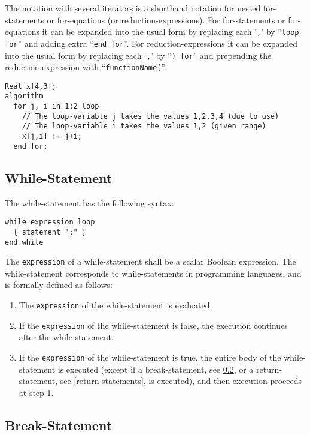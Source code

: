 The notation with several iterators is a shorthand notation for nested
for-statements or for-equations (or reduction-expressions). For
for-statements or for-equations it can be expanded into the usual form
by replacing each `\lstinline!,!' by ``\lstinline!loop for!'' and adding extra ``\lstinline!end for!''. For
reduction-expressions it can be expanded into the usual form by
replacing each `\lstinline!,!' by ``\lstinline!) for!'' and prepending the reduction-expression
with ``\lstinline!functionName(!''.

\begin{example}
\begin{lstlisting}[language=modelica]
  Real x[4,3];
algorithm
  for j, i in 1:2 loop
    // The loop-variable j takes the values 1,2,3,4 (due to use)
    // The loop-variable i takes the values 1,2 (given range)
    x[j,i] := j+i;
  end for;
\end{lstlisting}
\end{example}

\subsection{While-Statement}\label{while-statement}

The while-statement has the following syntax:
\begin{lstlisting}[language=grammar]
while expression loop
  { statement ";" }
end while
\end{lstlisting}
The \lstinline!expression! of a while-statement shall be a scalar Boolean
expression. The while-statement corresponds to while-statements in
programming languages, and is formally defined as follows:
\begin{enumerate}
\item The \lstinline!expression! of the while-statement is evaluated.
\item If the \lstinline!expression! of the while-statement is false, the execution
continues after the while-statement.
\item If the \lstinline!expression! of the while-statement is true, the entire body of
the while-statement is executed (except if a break-statement, see
\cref{break-statement}, or a return-statement, see \cref{return-statements}, is executed),
and then execution proceeds at step 1.
\end{enumerate}

\subsection{Break-Statement}\label{break-statement}

